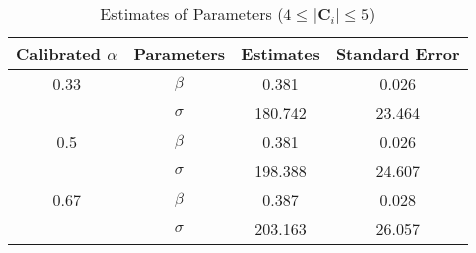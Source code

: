 \begin{table}[H]
    \centering
    \caption{Estimates of Parameters ($4 \leq |\mathbf{C}_i| \leq 5$)}
    \label{table: estimates (min_size=4 max_size=5 margin=2000)}
    \begin{tabular}{cccc}
        \toprule
        Calibrated $\alpha$ & Parameters & Estimates & Standard Error \\
        \midrule
        0.33                & $\beta$    & 0.381     & 0.026          \\
                            & $\sigma$   & 180.742   & 23.464         \\
        \midrule
        0.5                 & $\beta$    & 0.381     & 0.026          \\
                            & $\sigma$   & 198.388   & 24.607         \\
        \midrule
        0.67                & $\beta$    & 0.387     & 0.028          \\
                            & $\sigma$   & 203.163   & 26.057         \\
        \bottomrule
    \end{tabular}
\end{table}
